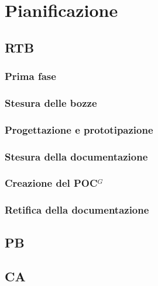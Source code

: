 \section{Pianificazione}

\subsection{RTB}

\subsubsection{Prima fase}

\subsubsection{Stesura delle bozze}

\subsubsection{Progettazione e prototipazione}

\subsubsection{Stesura della documentazione}

\subsubsection{Creazione del \gls{POC}$^G$}

\subsubsection{Retifica della documentazione}

\subsection{PB}

\subsection{CA}
